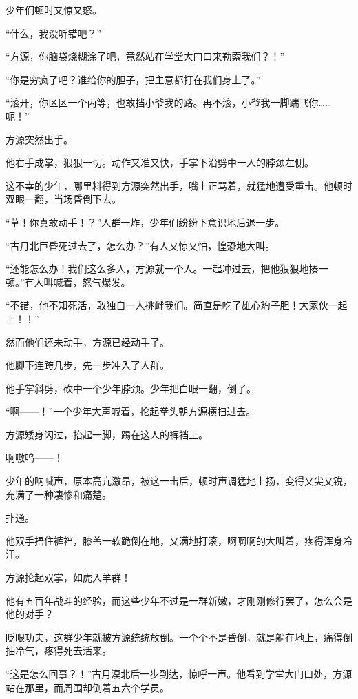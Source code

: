 
\begin{this_body}

少年们顿时又惊又怒。

“什么，我没听错吧？”

“方源，你脑袋烧糊涂了吧，竟然站在学堂大门口来勒索我们？！”

“你是穷疯了吧？谁给你的胆子，把主意都打在我们身上了。”

“滚开，你区区一个丙等，也敢挡小爷我的路。再不滚，小爷我一脚踹飞你……呃！”

方源突然出手。

他右手成掌，狠狠一切。动作又准又快，手掌下沿劈中一人的脖颈左侧。

这不幸的少年，哪里料得到方源突然出手，嘴上正骂着，就猛地遭受重击。他顿时双眼一翻，当场昏倒下去。

“草！你真敢动手！？”人群一炸，少年们纷纷下意识地后退一步。

“古月北巨昏死过去了，怎么办？”有人又惊又怕，惶恐地大叫。

“还能怎么办！我们这么多人，方源就一个人。一起冲过去，把他狠狠地揍一顿。”有人叫喊着，怒气爆发。

“不错，他不知死活，敢独自一人挑衅我们。简直是吃了雄心豹子胆！大家伙一起上！！”

然而他们还未动手，方源已经动手了。

他脚下连跨几步，先一步冲入了人群。

他手掌斜劈，砍中一个少年脖颈。少年把白眼一翻，倒了。

“啊——！”一个少年大声喊着，抡起拳头朝方源横扫过去。

方源矮身闪过，抬起一脚，踢在这人的裤裆上。

啊嗷呜——！

少年的呐喊声，原本高亢激昂，被这一击后，顿时声调猛地上扬，变得又尖又锐，充满了一种凄惨和痛楚。

扑通。

他双手捂住裤裆，膝盖一软跪倒在地，又满地打滚，啊啊啊的大叫着，疼得浑身冷汗。

方源抡起双掌，如虎入羊群！

他有五百年战斗的经验，而这些少年不过是一群新嫩，才刚刚修行罢了，怎么会是他的对手？

眨眼功夫，这群少年就被方源统统放倒。一个个不是昏倒，就是躺在地上，痛得倒抽冷气，疼得死去活来。

“这是怎么回事？！”古月漠北后一步到达，惊呼一声。他看到学堂大门口处，方源站在那里，而周围却倒着五六个学员。


\end{this_body}
